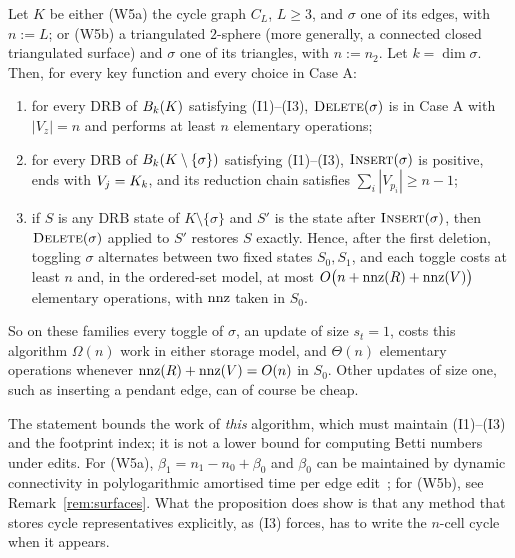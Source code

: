 \begin{proposition}\label{prop:nonlocal}
Let $K$ be either (W5a) the cycle graph $C_L$, $L\ge3$, and $\sigma$ one of its
edges, with $n:=L$; or (W5b) a triangulated $2$-sphere (more generally, a
connected closed triangulated surface) and $\sigma$ one of its triangles, with
$n:=n_2$. Let $k=\dim\sigma$. Then, for every key function and every choice in
Case A:
\begin{enumerate}
\item[(a)] for every DRB of $B_{k}(K)$ satisfying (I1)--(I3), $\textup{\textsc{Delete}}(\sigma)$ is in
  Case A with $|V_z|=n$ and performs at least $n$ elementary operations;
\item[(b)] for every DRB of $B_{k}(K\setminus\{\sigma\})$ satisfying
  (I1)--(I3), $\textup{\textsc{Insert}}(\sigma)$ is positive, ends with $V_j=K_{k}$, and its
  reduction chain satisfies $\sum_i|V_{p_i}|\ge n-1$;
\item[(c)] if $S$ is any DRB state of $K\setminus\{\sigma\}$ and $S'$ is the state
  after $\textup{\textsc{Insert}}(\sigma)$, then $\textup{\textsc{Delete}}(\sigma)$ applied to $S'$ restores $S$ exactly.
  Hence, after the first deletion, toggling $\sigma$ alternates between two fixed
  states $S_0,S_1$, and each toggle costs at least $n$ and, in the ordered-set
  model, at most $O\bigl(n+\operatorname{nnz}(R)+\operatorname{nnz}(V)\bigr)$ elementary operations, with
  $\operatorname{nnz}$ taken in $S_0$.
\end{enumerate}
So on these families every toggle of $\sigma$, an update of size $s_t=1$,
costs this algorithm $\Omega(n)$ work in either storage model, and $\Theta(n)$
elementary operations whenever $\operatorname{nnz}(R)+\operatorname{nnz}(V)=O(n)$ in $S_0$. Other updates of
size one, such as inserting a pendant edge, can of course be cheap.
\end{proposition}

The statement bounds the work of \emph{this} algorithm, which must maintain
(I1)--(I3) and the footprint index; it is not a lower bound for computing Betti
numbers under edits. For (W5a), $\beta_1=n_1-n_0+\beta_0$ and $\beta_0$ can be
maintained by dynamic connectivity in polylogarithmic amortised time per edge
edit~\cite{holm2001polylog}; for (W5b), see Remark~\ref{rem:surfaces}. What the
proposition does show is that any method that stores cycle representatives
explicitly, as (I3) forces, has to write the $n$-cell cycle when it appears.

